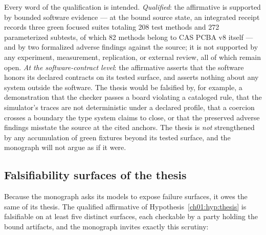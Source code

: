 Every word of the qualification is intended. \emph{Qualified}: the
affirmative is supported by bounded software evidence --- at the bound
source state, an integrated receipt records three green focused suites
totaling 208 test methods and 272 parameterized subtests, of which 82
methods belong to CAS PCBA v8 itself --- and by two formalized adverse
findings against the source; it is not supported by any experiment,
measurement, replication, or external review, all of which remain open.
\emph{At the software-contract level}: the affirmative asserts that the
software honors its declared contracts on its tested surface, and asserts
nothing about any system outside the software. The thesis would be
falsified by, for example, a demonstration that the checker passes a board
violating a cataloged rule, that the simulator's traces are not
deterministic under a declared profile, that a coercion crosses a boundary
the type system claims to close, or that the preserved adverse findings
misstate the source at the cited anchors. The thesis is \emph{not}
strengthened by any accumulation of green fixtures beyond its tested
surface, and the monograph will not argue as if it were.

\subsection{Falsifiability surfaces of the thesis}\label{ch01:thesis:falsifiers}

Because the monograph asks its models to expose failure surfaces, it owes
the same of its thesis. The qualified affirmative of
Hypothesis~\ref{ch01:hyp:thesis} is falsifiable on at least five distinct
surfaces, each checkable by a party holding the bound artifacts, and the
monograph invites exactly this scrutiny:

